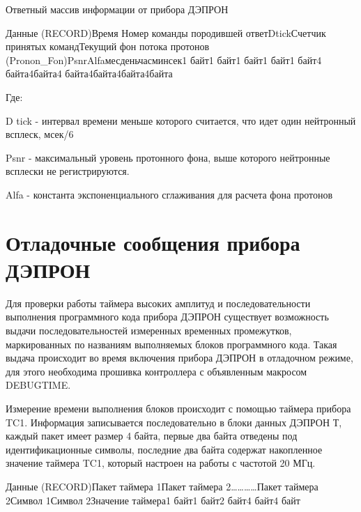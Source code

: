 Ответный массив информации от прибора ДЭПРОН


{\small Данные (RECORD)Время Номер команды породившей ответD}{\small  }{\small tickСчетчик принятых командТекущий фон потока протонов (}{\small Pronon}{\small \_}{\small Fon}{\small )PsnrAlfaмесденьчасминсек1 байт1 байт1 байт1 байт1 байт4 байта}{\small 4}{\small  байта4 байта}{\small 4}{\small  байта}{\small 4}{\small  байта}{\small 4}{\small  байта}


\begin{flushleft}
	Где:
\end{flushleft}


\begin{flushleft}
	D tick - интервал времени меньше которого считается, что идет один нейтронный всплеск, мсек/6
\end{flushleft}


Psnr - максимальный уровень протонного фона, выше которого нейтронные всплески не регистрируются.


Alfa - константа экспоненциального сглаживания для расчета фона протонов





\section{Отладочные сообщения прибора ДЭПРОН}



Для проверки работы таймера высоких амплитуд и последовательности выполнения программного кода прибора ДЭПРОН существует возможность выдачи последовательностей измеренных временных промежутков, маркированных по названиям выполняемых блоков программного кода. Такая выдача происходит во время включения прибора ДЭПРОН в отладочном режиме, для этого необходима прошивка контроллера с объявленным макросом DEBUGTIME.


Измерение времени выполнения блоков происходит с помощью таймера прибора TC1. Информация записывается последовательно в блоки данных ДЭПРОН Т, каждый пакет имеет размер 4 байта, первые два байта отведены под идентификационные символы, последние два байта содержат накопленное значение таймера TC1, который настроен на работы с частотой 20 МГц.


{\small Данные (RECORD)Пакет таймера 1Пакет таймера 2\ldots{}\ldots{}\ldots{}\ldots{}Пакет таймера 2Символ 1Символ 2Значение таймера1 байт1 байт2 байт4 байт4 байт}





